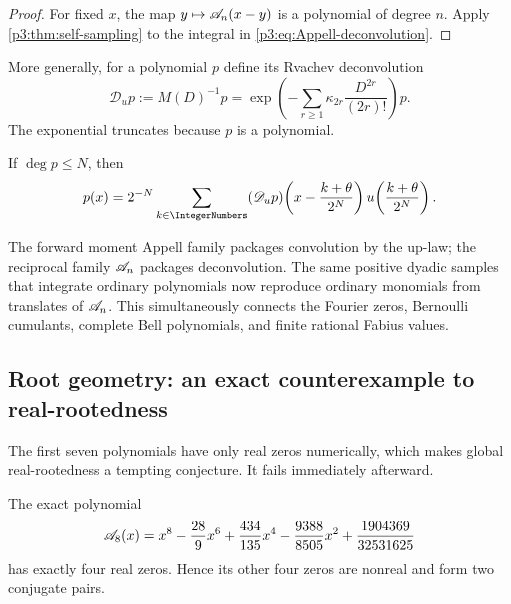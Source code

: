 \documentclass[11pt,oneside]{article}
\numberwithin{equation}{section}
\theoremstyle{definition}
\theoremstyle{remark}
\begin{document}
\begin{proof}
For fixed $x$, the map $y\mapsto\mathscr A_n(x-y)$ is a polynomial of degree $n$.  Apply \cref{p3:thm:self-sampling} to the integral in \eqref{p3:eq:Appell-deconvolution}.
\end{proof}

More generally, for a polynomial $p$ define its Rvachev deconvolution
\begin{equation}
 \mathscr D_up
 :=M(D)^{-1}p
 =\exp\!\left(-\sum_{r\ge1}\kappa_{2r}
 \frac{D^{2r}}{(2r)!}\right)p.
 \label{p3:eq:polynomial-deconvolution}
\end{equation}
The exponential truncates because $p$ is a polynomial.

\begin{corollary}
\label{p3:cor:polynomial-deconvolution}
If $\deg p\le N$, then
\begin{equation}
 p(x)=2^{-N}\sum_{k\in\IntegerNumbers}
 (\mathscr D_up)\!\left(x-\frac{k+\theta}{2^N}\right)
 u\!\left(\frac{k+\theta}{2^N}\right).
 \label{p3:eq:general-deconvolution-reproduction}
\end{equation}
\end{corollary}

\begin{resultbox}
The forward moment Appell family packages convolution by the up-law; the reciprocal family $\mathscr A_n$ packages deconvolution.  The same positive dyadic samples that integrate ordinary polynomials now reproduce ordinary monomials from translates of $\mathscr A_n$.  This simultaneously connects the Fourier zeros, Bernoulli cumulants, complete Bell polynomials, and finite rational Fabius values.
\end{resultbox}

\subsection{Root geometry: an exact counterexample to real-rootedness}

The first seven polynomials have only real zeros numerically, which makes global real-rootedness a tempting conjecture.  It fails immediately afterward.

\begin{proposition}
\label{p3:prop:A8-roots}
The exact polynomial
\begin{equation}
 \mathscr A_8(x)
 =x^8-\frac{28}{9}x^6+\frac{434}{135}x^4
 -\frac{9388}{8505}x^2+\frac{1904369}{32531625}
 \label{p3:eq:A8}
\end{equation}
has exactly four real zeros.  Hence its other four zeros are nonreal and form two conjugate pairs.
\end{proposition}
\end{document}
